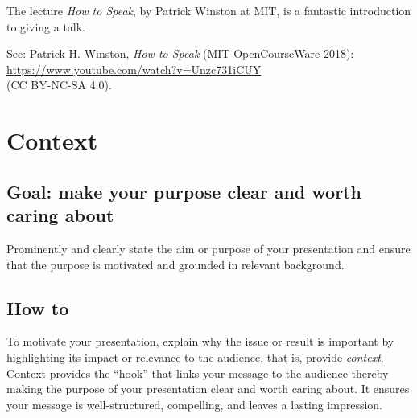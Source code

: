 \documentclass[
  a4paper,
  DIV=11,
  numbers=noendperiod,
  oneside]{scrreprt}
\begin{document}
\begin{tcolorbox}[enhanced jigsaw, colframe=quarto-callout-tip-color-frame, title=\textcolor{quarto-callout-tip-color}{\faLightbulb}\hspace{0.5em}{How to Speak}, breakable, opacityback=0, titlerule=0mm, colbacktitle=quarto-callout-tip-color!10!white, toptitle=1mm, colback=white, coltitle=black, toprule=.15mm, bottomtitle=1mm, left=2mm, arc=.35mm, rightrule=.15mm, bottomrule=.15mm, opacitybacktitle=0.6, leftrule=.75mm]

The lecture \emph{How to Speak}, by Patrick Winston at MIT, is a
fantastic introduction to giving a talk.

See: Patrick H. Winston, \emph{How to Speak} (MIT OpenCourseWare 2018):
\url{https://www.youtube.com/watch?v=Unzc731iCUY}\\
(CC BY-NC-SA 4.0).

\end{tcolorbox}

\section{Context}\label{sec-pres-context}

\subsection{Goal: make your purpose clear and worth caring
about}\label{goal-make-your-purpose-clear-and-worth-caring-about}

Prominently and clearly state the aim or purpose of your presentation
and ensure that the purpose is motivated and grounded in relevant
background.

\subsection{How to}\label{how-to-6}

To motivate your presentation, explain why the issue or result is
important by highlighting its impact or relevance to the audience, that
is, provide \emph{context}. Context provides the ``hook'' that links
your message to the audience thereby making the purpose of your
presentation clear and worth caring about. It ensures your message is
well-structured, compelling, and leaves a lasting impression.
\end{document}
